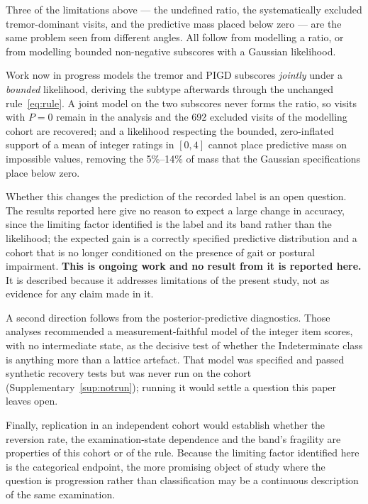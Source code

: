 \documentclass[11pt]{article}
\begin{document}
Three of the limitations above --- the undefined ratio, the systematically
excluded tremor-dominant visits, and the predictive mass placed below zero --- are
the same problem seen from different angles. All follow from modelling a ratio,
or from modelling bounded non-negative subscores with a Gaussian likelihood.

Work now in progress models the tremor and PIGD subscores \emph{jointly} under a
\emph{bounded} likelihood, deriving the subtype afterwards through the unchanged
rule~\eqref{eq:rule}. A joint model on the two subscores never forms the ratio, so
visits with $P = 0$ remain in the analysis and the 692 excluded visits of the
modelling cohort are recovered; and a likelihood respecting the bounded,
zero-inflated support of a mean of integer ratings in $[0,4]$ cannot place
predictive mass on impossible values, removing the 5\%--14\% of mass that the
Gaussian specifications place below zero.

Whether this changes the prediction of the recorded label is an open question. The
results reported here give no reason to expect a large change in accuracy, since
the limiting factor identified is the label and its band rather than the
likelihood; the expected gain is a correctly specified predictive distribution and
a cohort that is no longer conditioned on the presence of gait or postural
impairment. \textbf{This is ongoing work and no result from it is reported here.}
It is described because it addresses limitations of the present study, not as
evidence for any claim made in it.

A second direction follows from the posterior-predictive diagnostics. Those
analyses recommended a measurement-faithful model of the integer item scores, with
no intermediate state, as the decisive test of whether the Indeterminate class is
anything more than a lattice artefact. That model was specified and passed
synthetic recovery tests but was never run on the cohort
(Supplementary~\ref{sup:notrun}); running it would settle a question this paper
leaves open.

Finally, replication in an independent cohort would establish whether the
reversion rate, the examination-state dependence and the band's fragility are
properties of this cohort or of the rule. Because the limiting factor identified
here is the categorical endpoint, the more promising object of study where the
question is progression rather than classification may be a continuous description
of the same examination.

\end{document}
